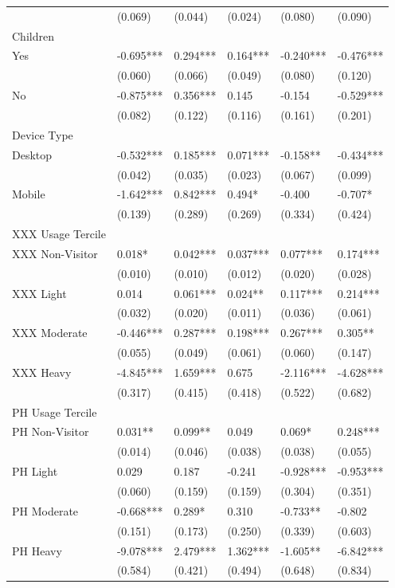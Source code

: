 \begin{tabular}{llllll}
 & (0.069) & (0.044) & (0.024) & (0.080) & (0.090)\\
Children &  &  &  &  & \\
Yes & -0.695*** & 0.294*** & 0.164*** & -0.240*** & -0.476***\\
\addlinespace
 & (0.060) & (0.066) & (0.049) & (0.080) & (0.120)\\
No & -0.875*** & 0.356*** & 0.145 & -0.154 & -0.529***\\
 & (0.082) & (0.122) & (0.116) & (0.161) & (0.201)\\
Device Type &  &  &  &  & \\
Desktop & -0.532*** & 0.185*** & 0.071*** & -0.158** & -0.434***\\
\addlinespace
 & (0.042) & (0.035) & (0.023) & (0.067) & (0.099)\\
Mobile & -1.642*** & 0.842*** & 0.494* & -0.400 & -0.707*\\
 & (0.139) & (0.289) & (0.269) & (0.334) & (0.424)\\
XXX Usage Tercile &  &  &  &  & \\
XXX Non-Visitor & 0.018* & 0.042*** & 0.037*** & 0.077*** & 0.174***\\
\addlinespace
 & (0.010) & (0.010) & (0.012) & (0.020) & (0.028)\\
XXX Light & 0.014 & 0.061*** & 0.024** & 0.117*** & 0.214***\\
 & (0.032) & (0.020) & (0.011) & (0.036) & (0.061)\\
XXX Moderate & -0.446*** & 0.287*** & 0.198*** & 0.267*** & 0.305**\\
 & (0.055) & (0.049) & (0.061) & (0.060) & (0.147)\\
\addlinespace
XXX Heavy & -4.845*** & 1.659*** & 0.675 & -2.116*** & -4.628***\\
 & (0.317) & (0.415) & (0.418) & (0.522) & (0.682)\\
PH Usage Tercile &  &  &  &  & \\
PH Non-Visitor & 0.031** & 0.099** & 0.049 & 0.069* & 0.248***\\
 & (0.014) & (0.046) & (0.038) & (0.038) & (0.055)\\
\addlinespace
PH Light & 0.029 & 0.187 & -0.241 & -0.928*** & -0.953***\\
 & (0.060) & (0.159) & (0.159) & (0.304) & (0.351)\\
PH Moderate & -0.668*** & 0.289* & 0.310 & -0.733** & -0.802\\
 & (0.151) & (0.173) & (0.250) & (0.339) & (0.603)\\
PH Heavy & -9.078*** & 2.479*** & 1.362*** & -1.605** & -6.842***\\
\addlinespace
 & (0.584) & (0.421) & (0.494) & (0.648) & (0.834)\\
\bottomrule
\end{tabular}
